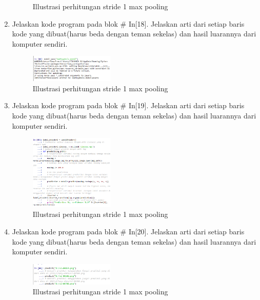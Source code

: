 \begin{enumerate}
\begin{figure}[H]
    \centering
    \caption{Illustrasi perhitungan stride 1 max pooling}
\end{figure}
\item Jelaskan kode program pada blok \# In[18]. Jelaskan arti dari setiap baris kode yang dibuat(harus beda dengan teman sekelas) dan hasil luarannya dari komputer sendiri.

\begin{figure}[H]
    \includegraphics[width=4cm]{figures/1174003/7/praktek_18.png}
    \centering
    \caption{Illustrasi perhitungan stride 1 max pooling}
\end{figure}
\item Jelaskan kode program pada blok \# In[19]. Jelaskan arti dari setiap baris kode yang dibuat(harus beda dengan teman sekelas) dan hasil luarannya dari komputer sendiri.

\begin{figure}[H]
    \includegraphics[width=4cm]{figures/1174003/7/praktek_19.png}
    \centering
    \caption{Illustrasi perhitungan stride 1 max pooling}
\end{figure}
\item Jelaskan kode program pada blok \# In[20]. Jelaskan arti dari setiap baris kode yang dibuat(harus beda dengan teman sekelas) dan hasil luarannya dari komputer sendiri.

\begin{figure}[H]
    \includegraphics[width=4cm]{figures/1174003/7/praktek_20.png}
    \centering
    \caption{Illustrasi perhitungan stride 1 max pooling}
\end{figure}
\end{enumerate}
